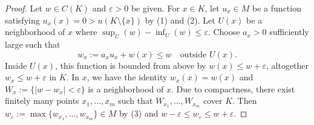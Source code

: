 \documentclass[10pt,a4paper]{amsart}
\begin{document}
\begin{proof}
Let $w\in C(K)$ and $\varepsilon>0$ be given. For $x\in K$, let
$u_{x}\in M$ be a function satisfying $u_{x}(x)=0>u(K\setminus\{x\})$
by (1) and (2). Let $U(x)$ be a neighborhood of $x$ where $\sup_{U}(w)-\inf_{U}(w)\leq\varepsilon$.
Choose $a_{x}>0$ sufficiently large such that 
\[
w_{x}:=a_{x}u_{x}+w(x)\leq w\quad\text{outside }U(x).
\]
Inside $U(x)$, this function is bounded from above by $w(x)\leq w+\varepsilon$,
altogether $w_{x}\leq w+\varepsilon$ in $K$. In $x$, we have the
identity $w_{x}(x)=w(x)$ and $W_{x}:=\{|w-w_{x}|<\varepsilon\}$
is a neighborhood of $x$. Due to compactness, there exist finitely
many points $x_{1},\dots,x_{m}$ such that $W_{x_{1}},\dots,W_{x_{m}}$
cover $K$. Then $w_{\varepsilon}:=\max\{w_{x_{1}},\dots,w_{x_{m}}\}\in M$
by (3) and $w-\varepsilon\leq w_{\varepsilon}\leq w+\varepsilon$.
\end{proof}
\end{document}
